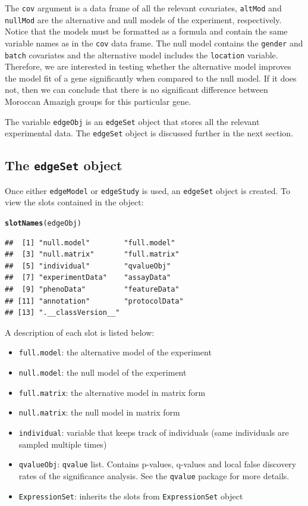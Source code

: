 \documentclass{article}\usepackage[]{graphicx}\usepackage[]{color}
\makeatletter
\newcommand{\hlstd}[1]{\textcolor[rgb]{0.345,0.345,0.345}{#1}}%
\newcommand{\hlkwd}[1]{\textcolor[rgb]{0.737,0.353,0.396}{\textbf{#1}}}%
\newenvironment{kframe}{%
 \def\at@end@of@kframe{}%
 \ifinner\ifhmode%
  \def\at@end@of@kframe{\end{minipage}}%
  \begin{minipage}{\columnwidth}%
 \fi\fi%
 \def\FrameCommand##1{\hskip\@totalleftmargin \hskip-\fboxsep
 \colorbox{shadecolor}{##1}\hskip-\fboxsep
     \hskip-\linewidth \hskip-\@totalleftmargin \hskip\columnwidth}%
 \MakeFramed {\advance\hsize-\width
   \@totalleftmargin\z@ \linewidth\hsize
   \@setminipage}}%
 {\par\unskip\endMakeFramed%
 \at@end@of@kframe}
\newenvironment{knitrout}{}{} %
\makeatother
\begin{document}
The {\tt cov} argument is a data frame of all the relevant covariates, {\tt altMod} and {\tt nullMod} are the alternative and null models of the experiment, respectively. Notice that the models must be formatted as a formula and contain the same variable names as in the {\tt cov} data frame. The null model contains the {\tt gender} and {\tt batch} covariates and the alternative model includes the {\tt location} variable. Therefore, we are interested in testing whether the alternative model improves the model fit of a gene significantly when compared to the null model. If it does not, then we can conclude that there is no significant difference between Moroccan Amazigh groups for this particular gene. 

The variable {\tt edgeObj} is an {\tt edgeSet} object that stores all the relevant experimental data. The {\tt edgeSet} object is discussed further in the next section. 

\subsection{The {\tt edgeSet} object}
Once either {\tt edgeModel} or {\tt edgeStudy} is used, an {\tt edgeSet} object is created. To view the slots contained in the object:
\begin{knitrout}
\color{fgcolor}\begin{kframe}
\begin{alltt}
\hlkwd{slotNames}\hlstd{(edgeObj)}
\end{alltt}
\begin{verbatim}
##  [1] "null.model"        "full.model"       
##  [3] "null.matrix"       "full.matrix"      
##  [5] "individual"        "qvalueObj"        
##  [7] "experimentData"    "assayData"        
##  [9] "phenoData"         "featureData"      
## [11] "annotation"        "protocolData"     
## [13] ".__classVersion__"
\end{verbatim}
\end{kframe}
\end{knitrout}
A description of each slot is listed below: 
\begin{itemize}
\item {\tt full.model}: the alternative model of the experiment
\item {\tt null.model}: the null model of the experiment
\item {\tt full.matrix}: the alternative model in matrix form
\item {\tt null.matrix}: the null model in matrix form
\item {\tt individual}: variable that keeps track of individuals (same individuals are sampled multiple times)
\item {\tt qvalueObj}: {\tt qvalue} list. Contains p-values, q-values and local false discovery rates of the significance analysis. See the {\tt qvalue} package for more details.
\item {\tt ExpressionSet}: inherits the slots from {\tt ExpressionSet} object
\end{itemize}
\end{document}
